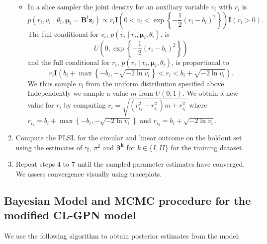 \documentclass[12pt,]{article}
\begin{document}
\begin{enumerate}
\begin{itemize}
\item In a slice sampler the joint density for an auxiliary variable $v_{i}$ with $r_{i}$ is
$$p(r_{i}, v_{i}\mid \theta_{i}, \boldsymbol{\mu}_{i}=\boldsymbol{B}^t\boldsymbol{z}_{i}) \propto r_{i} \textbf{I}\left(0 < v_i < \exp\left\{ -\frac{1}{2}(r_{i} - b_{i})^2\right\}\right)\textbf{I}(r_i > 0).$$
\noindent The full conditional for $v_{i}$, $p(v_{i} \mid r_{i},\boldsymbol{\mu}_{i}, \theta_{i})$, is
$$U\left(0, \exp\left\{-\frac{1}{2}(r_{i} -  b _{i})^2\right\}\right)$$
and the full conditional for $r_i$, $p(r_{i} \mid v_{i},\boldsymbol{\mu}_{i}, \theta_{i})$, is proportional to
$$r_{i} \textbf{I}\left(b_{i} + \max\left\{-b_{i}, -\sqrt{-2\ln v_{i}}\right\} < r_{i} < b_{i} + \sqrt{-2\ln v_{i}}\right).$$
\noindent We thus sample $v_{i}$ from the uniform distribution specified above. Independently we sample a value $m$ from $U(0,1)$. We obtain a new value for $r_{i}$ by computing $ r_{i} = \sqrt{(r_{i_{2}}^{2}-r_{i_{1}}^{2})m + r_{i_{1}}^{2}}$ where $r_{i_{1}}=b_{i} +\max\left\{-b_{i}, -\sqrt{-2\ln v_{i}}\right\}$ and $ r_{i_{2}}= b_{i} + \sqrt{-2\ln v_{i}}$.
\end{itemize}
\item Compute the PLSL for the circular and linear outcome on the holdout set using the estimates of $\boldsymbol{\gamma}$, $\sigma^2$ and $\boldsymbol{\beta^{k}}$ for $k \in \{I,II\}$ for the training dataset.
\item Repeat steps 4 to 7 until the sampled parameter estimates have converged. We assess convergence visually using traceplots.
\end{enumerate}

\newpage
\subsection{Bayesian Model and MCMC procedure for the modified CL-GPN model}\label{A2}

We use the following algorithm to obtain posterior estimates from the
model:
\end{document}
